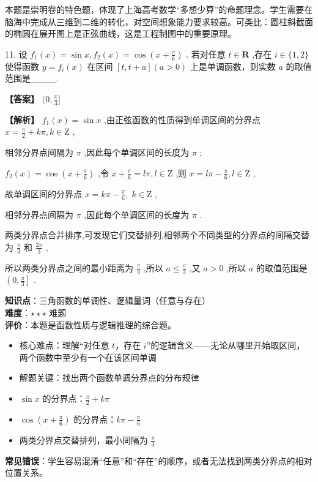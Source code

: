 \documentclass[10pt]{article}
\begin{document}
\begin{tipbox}[教学提示]
本题是崇明卷的特色题，体现了上海高考数学``多想少算''的命题理念。学生需要在脑海中完成从三维到二维的转化，对空间想象能力要求较高。可类比：圆柱斜截面的椭圆在展开图上是正弦曲线，这是工程制图中的重要原理。
\end{tipbox}

11. 设 \({f}_{1}\left( x\right)  = \sin x,{f}_{2}\left( x\right)  = \cos \left( {x + \frac{\pi }{6}}\right)\) . 若对任意 \(t \in  \mathbf{R}\) ,存在 \(i \in  \{ 1,2\}\) 使得函数 \(y = {f}_{i}\left( x\right)\) 在区间 \(\left\lbrack  {t,t + a}\right\rbrack  \left( {a > 0}\right)\) 上是单调函数，则实数 \(a\) 的取值范围是\_\_\_\_.

\textbf{【答案】} \((0,\frac{\pi }{3}\rbrack\)

\textbf{【解析】} \({f}_{1}\left( x\right)  = \sin x\) ,由正弦函数的性质得到单调区间的分界点 \(x = \frac{\pi }{2} + {k\pi },k \in  \mathrm{Z}\) ,

相邻分界点间隔为 \(\pi\) ,因此每个单调区间的长度为 \(\pi\) ;

\({f}_{2}\left( x\right)  = \cos \left( {x + \frac{\pi }{6}}\right)\) ,令 \(x + \frac{\pi }{6} = {l\pi },l \in  \mathrm{Z}\) ,则 \(x = {l\pi } - \frac{\pi }{6},l \in  \mathrm{Z}\) ,

故单调区间的分界点 \(x = {k\pi } - \frac{\pi }{6},\;k \in  \mathrm{Z}\) ,

相邻分界点间隔为 \(\pi\) ,因此每个单调区间的长度为 \(\pi\) .

两类分界点合并排序,可发现它们交替排列,相邻两个不同类型的分界点的间隔交替为 \(\frac{\pi }{3}\) 和 \(\frac{2\pi }{3}\) ,

所以两类分界点之间的最小距离为 \(\frac{\pi }{3}\) ,所以 \(a \leq  \frac{\pi }{3}\) ,又 \(a > 0\) ,所以 \(a\) 的取值范围是 \(\left( {0,\frac{\pi }{3}}\right\rbrack\) .

\begin{analysisbox}[考点分析]
\textbf{知识点}：三角函数的单调性、逻辑量词（任意与存在）\\
\textbf{难度}：\(\star\star\star\) 难题\\
\textbf{评价}：本题是函数性质与逻辑推理的综合题。
\begin{itemize}
\item 核心难点：理解``对任意 \(t\)，存在 \(i\)''的逻辑含义——无论从哪里开始取区间，两个函数中至少有一个在该区间单调
\item 解题关键：找出两个函数单调分界点的分布规律
\item \(\sin x\) 的分界点：\(\frac{\pi}{2} + k\pi\)
\item \(\cos(x+\frac{\pi}{6})\) 的分界点：\(k\pi - \frac{\pi}{6}\)
\item 两类分界点交替排列，最小间隔为 \(\frac{\pi}{3}\)
\end{itemize}
\textbf{常见错误}：学生容易混淆``任意''和``存在''的顺序，或者无法找到两类分界点的相对位置关系。
\end{analysisbox}
\end{document}
